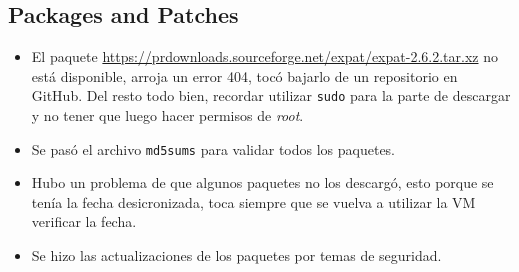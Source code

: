 \documentclass{article}
\begin{document}
\subsection{Packages and Patches}

\begin{itemize}
  \item El paquete \url{https://prdownloads.sourceforge.net/expat/expat-2.6.2.tar.xz} no está disponible, arroja un error 404, tocó bajarlo de un repositorio en GitHub. Del resto todo bien, recordar utilizar \texttt{sudo} para la parte de descargar y no tener que luego hacer permisos de \textit{root}.
  \item Se pasó el archivo \texttt{md5sums} para validar todos los paquetes.
  \item Hubo un problema de que algunos paquetes no los descargó, esto porque se tenía la fecha desicronizada, toca siempre que se vuelva a utilizar la VM verificar la fecha.
  \item Se hizo las actualizaciones de los paquetes por temas de seguridad.
\end{itemize}
\end{document}
